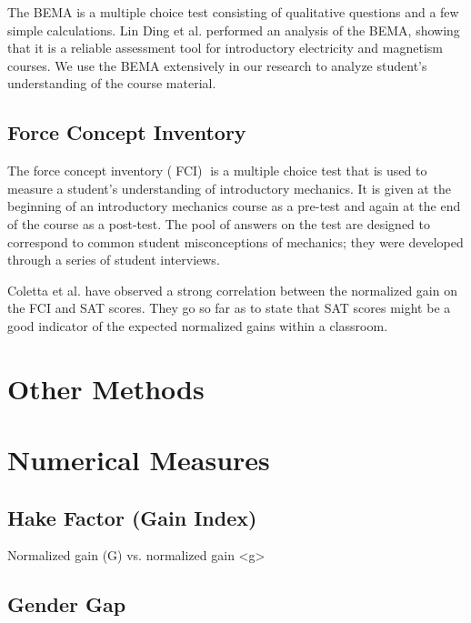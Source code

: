 The BEMA is a multiple choice test consisting of qualitative questions and a few simple calculations. Lin Ding et al. performed an analysis of the BEMA, showing that it is a reliable assessment tool for introductory electricity and magnetism courses\cite{ding2006}. We use the BEMA extensively in our research to analyze student's understanding of the course material.

\subsection{Force Concept Inventory}

The force concept inventory (􏰀FCI)􏰁 is a multiple choice test that is used to measure a student's understanding of introductory mechanics. It is given at the beginning of an introductory mechanics course as a pre-test and again at the end of the course as a post-test. The pool of answers on the test are designed to correspond to common student misconceptions of mechanics; they were developed through a series of student interviews\cite{hestenes1992}.

Coletta et al. have observed a strong correlation between the normalized gain on the FCI and SAT scores. They go so far as to state that SAT scores might be a good indicator of the expected normalized gains within a classroom\cite{coletta2007}.

\section{Other Methods}

\section{Numerical Measures}

\subsection{Hake Factor (Gain Index)}

Normalized gain (G) vs. normalized gain <g>

\subsection{Gender Gap}

